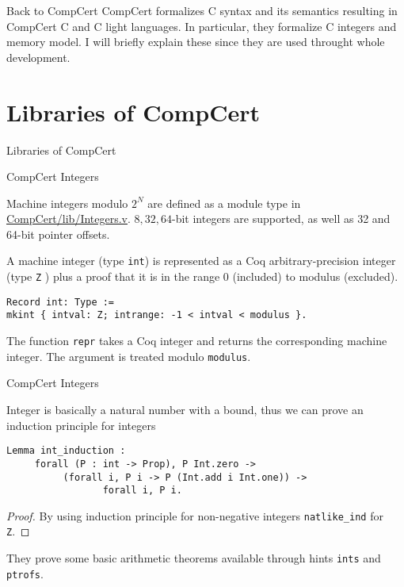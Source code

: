 \documentclass{beamer}
\begin{document}
\begin{frame}{Back to CompCert}
  CompCert formalizes C syntax and its semantics resulting in CompCert C and C light languages. In particular, they formalize C integers and memory model. I will briefly explain these since they are used throught whole development.
 \end{frame}
\section{Libraries of CompCert}

\begin{frame}

  \begin{center}
    \huge Libraries of CompCert
    \end{center}
  \end{frame}

\begin{frame}[t,fragile]{CompCert Integers}

  Machine integers modulo $2^N$ are defined as a module type in \url{CompCert/lib/Integers.v}. $8, 32, 64$-bit integers are supported, as well as 32 and 64-bit pointer offsets.\\
  
\bigskip

A machine integer (type \texttt{int}) is represented as a Coq arbitrary-precision
integer (type \texttt{Z} ) plus a proof that it is in the range 0 (included) to
modulus (excluded).


\begin{lstlisting}[language=Coq]
Record int: Type :=
mkint { intval: Z; intrange: -1 < intval < modulus }.
\end{lstlisting}

The function \texttt{repr} takes a Coq integer and returns the corresponding machine integer. The argument is treated modulo \texttt{modulus}.

\end{frame}

\begin{frame}[t,fragile]{CompCert Integers}

 Integer is basically a natural number with a bound, thus we can prove an induction principle for integers

\bigskip

\begin{lstlisting}[language=Coq]
  Lemma int_induction :
     forall (P : int -> Prop), P Int.zero ->
          (forall i, P i -> P (Int.add i Int.one)) ->
                 forall i, P i.
\end{lstlisting}

 \begin{proof}

   By using induction principle for non-negative integers \texttt{natlike\_ind} for \texttt{Z}.
                                       
 \end{proof}

 They prove some basic arithmetic theorems available through hints \texttt{ints} and \texttt{ptrofs}.

\end{frame}
\end{document}
